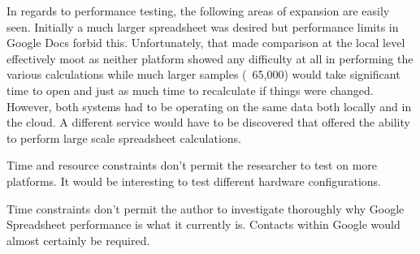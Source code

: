 
In regards to performance testing, the following areas of expansion are easily
seen.  Initially a much larger spreadsheet was desired but performance limits in
Google Docs forbid this.  Unfortunately, that made comparison at the local level
effectively moot as neither platform showed any difficulty at all in performing
the various calculations while much larger samples (~65,000) would take
significant time to open and just as much time to recalculate if things were
changed.  However, both systems had to be operating on the same data both
locally and in the cloud.  A different service would have to be discovered that
offered the ability to perform large scale spreadsheet calculations.

Time and resource constraints don't permit the researcher to test on more
platforms.  It would be interesting to test different hardware configurations.

Time constraints don't permit the author to investigate thoroughly why Google
Spreadsheet performance is what it currently is.  Contacts within Google would
almost certainly be required.
